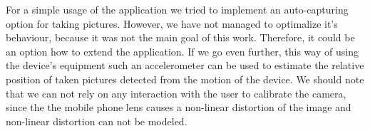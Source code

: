 For a simple usage of the application we tried to implement an auto-capturing option for taking pictures.
However, we have not managed to optimalize it's behaviour, because it was not the main goal of this work. 
Therefore, it could be an option how to extend the application.
If we go even further, this way of using the device's equipment such an accelerometer can be used to estimate the relative position of taken pictures detected from the motion of the device.
We should note that we can not rely on any interaction with the user to calibrate the camera, since the the mobile phone lens causes a non-linear distortion of the image and non-linear distortion can not be modeled.



